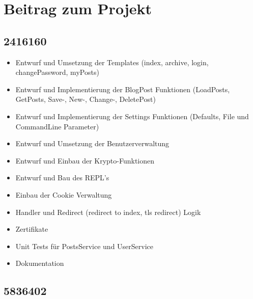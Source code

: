 \documentclass[10pt]{article}
\begin{document}
	\section{Beitrag zum Projekt}
		\subsection{2416160}
		\begin{itemize}
			\item Entwurf und Umsetzung der Templates (index, archive, login, changePassword, myPosts)
			\item Entwurf und Implementierung der BlogPost Funktionen (LoadPosts, GetPosts, Save-, New-, Change-, DeletePost)
			\item Entwurf und Implementierung der Settings Funktionen (Defaults, File und CommandLine Parameter)
			\item Entwurf und Umsetzung der Benutzerverwaltung
			\item Entwurf und Einbau der Krypto-Funktionen
			\item Entwurf und Bau des REPL's
			\item Einbau der Cookie Verwaltung
			\item Handler und Redirect (redirect to index, tls redirect) Logik
			\item Zertifikate
			\item Unit Tests f\"ur PostsService und UserService
			\item Dokumentation
		\end{itemize}		
		\subsection{5836402}
\end{document}
